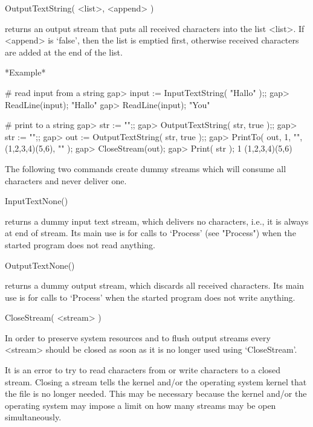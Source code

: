 \>OutputTextString( <list>, <append> )

returns an output stream that puts  all received characters into the list
<list>.   If <append>   is  `false',  then  the list   is  emptied first,
otherwise received characters are added at the end of the list.

*Example*

\begintt
    # read input from a string
    gap> input := InputTextString( "Hallo\nYou\n" );;
    gap> ReadLine(input);
    "Hallo\n"
    gap> ReadLine(input);
    "You\n"

    # print to a string
    gap> str := "";;
    gap> OutputTextString( str, true );;
    gap> str := "";;                    
    gap> out := OutputTextString( str, true );;
    gap> PrintTo( out, 1, "\n", (1,2,3,4)(5,6), "\n" );
    gap> CloseStream(out);
    gap> Print( str );
    1
    (1,2,3,4)(5,6)
\endtt


The following  two commands create  dummy streams  which will consume all
characters and never deliver one.


\>InputTextNone()

returns a dummy input text stream, which delivers no characters, i.e., it
is always at end of stream.  Its main use  is for calls to `Process' (see
"Process") when the started program does not read anything.

\>OutputTextNone()

returns a dummy output   stream, which discards all received  characters.
Its main use is for calls to `Process' when  the started program does not
write anything.


\>CloseStream( <stream> )

In order  to preserve system resources  and to flush output streams every
<stream> should  be  closed  as soon   as  it is   no longer   used using
`CloseStream'.

It is an error to  try to read  characters from or  write characters to a
closed  stream.   Closing a  stream tells  the {\GAP}   kernel and/or the
operating system kernel  that the file is  no longer needed.  This may be
necessary  because  the {\GAP} kernel  and/or  the  operating  system may
impose a limit on how many streams may be open simultaneously.

